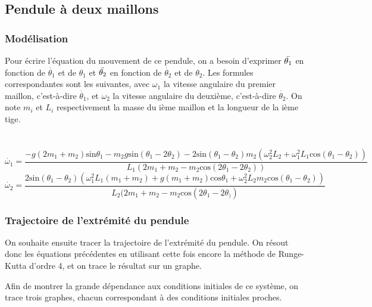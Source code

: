 \documentclass{article}
\begin{document}
\subsection{Pendule à deux maillons}


\subsubsection{Modélisation}

Pour écrire l'équation du mouvement de ce pendule, on a besoin d'exprimer $\Ddot{\theta_1}$ en fonction de $\Dot{\theta_1}$ et de $\theta_1$ et $\Ddot{\theta_2}$ en fonction de $\Dot{\theta_2}$ et de $\theta_2$. Les formules correspondantes sont les suivantes, avec $\omega_1$ la vitesse angulaire du premier maillon, c'est-à-dire $\Dot{\theta_1}$, et $\omega_2$ la vitesse angulaire du deuxième, c'est-à-dire $\Dot{\theta_2}.$ On note $m_i$ et $L_i$ respectivement la masse du ième maillon et la longueur de la ième tige. \\ \\ \\
\begin{equation}
    \Dot{\omega_1}=\frac{-g(2m_1+m_2)\text{sin}\theta_1-m_2g\text{sin}(\theta_1-2\theta_2)-2\text{sin}(\theta_1-\theta_2)m_2(\omega_2^2L_2+\omega_1^2L_1\text{cos}(\theta_1-\theta_2))}{L_1(2m_1+m_2-m_2\text{cos}(2\theta_1-2\theta_2))} 
\end{equation}
\begin{equation}
    \Dot{\omega_2}=\frac{2\text{sin}(\theta_1-\theta_2)(\omega_1^2L_1(m_1+m_2)+g(m_1+m_2)\text{cos}\theta_1+\omega_2^2L_2m_2\text{cos}(\theta_1-\theta_2))}
{L_2(2m_1+m_2-m_2\text{cos}(2\theta_1-2\theta_))}
\end{equation}

\subsubsection{Trajectoire de l'extrémité du pendule}

On souhaite ensuite tracer la trajectoire de l'extrémité du pendule. On résout donc les équations précédentes en utilisant cette fois encore la méthode de Runge-Kutta d’ordre 4, et on trace le résultat sur un graphe.

Afin de montrer la grande dépendance aux conditions initiales de ce système, on trace trois graphes, chacun correspondant à des conditions initiales proches. 
\end{document}
